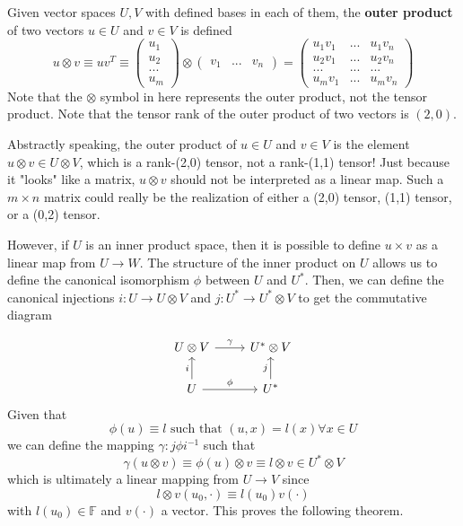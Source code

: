   \begin{definition}
  Given vector spaces $U, V$ with defined bases in each of them, the \textbf{outer product} of two vectors $u \in U$ and $v \in V$ is defined
  \[u \otimes v \equiv u v^T \equiv \begin{pmatrix}
  u_1 \\ u_2 \\ ... \\ u_m
  \end{pmatrix} \otimes \begin{pmatrix}
  v_1 & ... & v_n
  \end{pmatrix} = \begin{pmatrix}
  u_1 v_1 & ... & u_1 v_n \\
  u_2 v_1 & ... & u_2 v_n \\
  ... & ... & ... \\
  u_m v_1 & ... & u_m v_n 
  \end{pmatrix}\]
  Note that the $\otimes$ symbol in here represents the outer product, not the tensor product. Note that the tensor rank of the outer product of two vectors is $(2,0)$. 
  \end{definition}

  Abstractly speaking, the outer product of $u \in U$ and $v \in V$ is the element $u \otimes v \in U \otimes V$, which is a rank-(2,0) tensor, not a rank-(1,1) tensor! Just because it "looks" like a matrix, $u \otimes v$ should not be interpreted as a linear map. Such a $m \times n$ matrix could really be the realization of either a (2,0) tensor, (1,1) tensor, or a (0,2) tensor. 

  However, if $U$ is an inner product space, then it is possible to define $u \times v$ as a linear map from $U \longrightarrow W$. The structure of the inner product on $U$ allows us to define the canonical isomorphism $\phi$ between $U$ and $U^*$. Then, we can define the canonical injections $i: U \longrightarrow U \otimes V$ and $j: U^* \longrightarrow U^* \otimes V$ to get the commutative diagram 

  \[\begin{tikzcd}
      U \otimes V \arrow{r}{\gamma} & U^* \otimes V \\
      U \arrow{u}{i} \arrow{r}{\phi} & U^* \arrow{u}{j}
  \end{tikzcd}\]
  Given that 
  \[\phi(u) \equiv l \text{ such that } (u, x) = l(x) \forall x \in U\]
  we can define the mapping $\gamma: j \phi i^{-1}$ such that 
  \[\gamma (u \otimes v) \equiv \phi(u) \otimes v \equiv l \otimes v \in U^* \otimes V\]
  which is ultimately a linear mapping from $U \longrightarrow V$ since
  \[l \otimes v (u_0, \cdot) \equiv l(u_0) v(\cdot)\]
  with $l(u_0) \in \mathbb{F}$ and $v(\cdot)$ a vector. This proves the following theorem. 

